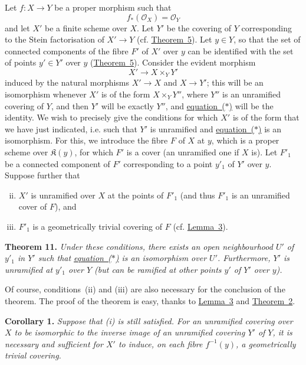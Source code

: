 \documentclass{article}
\newenvironment{itenv}[1]
  {\phantomsection\par\medskip\noindent\textbf{#1.}\itshape}
  {\par\medskip}
\newcommand{\scr}[1]{{\mathscr{#1}}}
\newcommand{\kres}{\mathfrak{K}}
\newcommand{\oldpage}[1]{\marginpar{\footnotesize$\Big\vert$ \textit{p.~#1}}}
\begin{document}
Let $f\colon X\to Y$ be a proper morphism such that
\[
\label{equationi}
  f_*(\scr{O}_X) = \scr{O}_Y
\tag{i}
\]
and let $X'$ be a finite scheme over $X$.
Let $Y'$ be the covering of $Y$ corresponding to the Stein factorisation of $X'\to Y$ (cf. \hyperref[theorem5]{Theorem~5}).
Let $y\in Y$, so that the set of connected components of the fibre $F'$ of $X'$ over $y$ can be identified with the set of points $y'\in Y'$ over $y$ (\hyperref[theorem5]{Theorem~5}).
Consider the evident morphism
\[
\label{equation*}
  X'\to X\times_Y Y'
\tag{$*$}
\]
induced by the natural morphisms $X'\to X$ and $X\to Y'$;
this will be an isomorphism whenever $X'$ is of the form $X\times_Y Y''$, where $Y''$ is an unramified covering of $Y$, and then $Y'$ will be exactly $Y''$, and \hyperref[equation*]{equation~($*$)} will be the identity.
We wish to precisely give the conditions for which $X'$ is of the form that we have just indicated, i.e. such that $Y'$ is unramified and \hyperref[equation*]{equation~($*$)} is an isomorphism.
For this, we introduce the fibre $F$ of $X$ at $y$, which is a proper scheme over $\kres(y)$, for which $F'$ is a cover (an unramified one if $X$ is).
Let $F'_1$ be a connected component of $F'$ corresponding to a point $y'_1$ of $Y'$ over $y$.
Suppose further that
\begin{enumerate}[(i)]
\setcounter{enumi}{1}
  \item $X'$ is unramified over $X$ at the points of $F'_1$ (and thus $F'_1$ is an unramified cover of $F$), and
  \item $F'_1$ is a geometrically trivial covering of $F$ (cf. \hyperref[lemma3]{Lemma~3}).
\end{enumerate}

\begin{itenv}{Theorem 11}
\label{theorem11}
  Under these conditions, there exists an open neighbourhood $U'$ of $y'_1$
\oldpage{182-22}
  in $Y'$ such that \hyperref[equation*]{equation~($*$)} is an isomorphism over $U'$.
  Furthermore, $Y'$ is unramified at $y'_1$ over $Y$ (but can be ramified at other points $y'$ of $Y'$ over $y$).
\end{itenv}

Of course, conditions~(ii) and (iii) are also necessary for the conclusion of the theorem.
The proof of the theorem is easy, thanks to \hyperref[lemma3]{Lemma~3} and \hyperref[theorem2]{Theorem~2}.

\begin{itenv}{Corollary 1}
\label{theorem11corollary1}
  Suppose that (i) is still satisfied.
  For an unramified covering over $X$ to be isomorphic to the inverse image of an unramified covering $Y'$ of $Y$, it is necessary and sufficient for $X'$ to induce, on each fibre $f^{-1}(y)$, a geometrically trivial covering.
\end{itenv}
\end{document}
